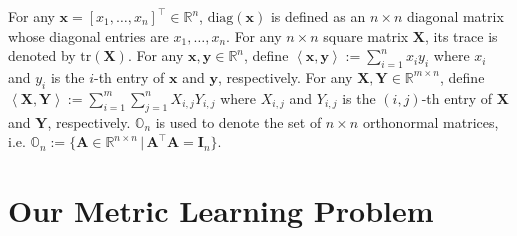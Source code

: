 \documentclass[10pt,onecolumn]{article}
\theoremstyle{definition}
\theoremstyle{definition}
\theoremstyle{definition}
\theoremstyle{definition}
\theoremstyle{definition}
\theoremstyle{theorem}
\newcommand{\0}{{\bm{0}}}
\newcommand{\1}{{\bm{1}}}
\newcommand{\x}{{\bm{x}}}
\newcommand{\y}{{\bm{y}}}
\newcommand{\vA}{{\bm{A}}}
\newcommand{\vC}{{\bm{C}}}
\newcommand{\vI}{{\bm{I}}}
\newcommand{\bN}{{\mathbb{N}}}
\newcommand{\bO}{{\mathbb{O}}}
\newcommand{\cP}{{\mathcal{P}}}
\newcommand{\bR}{{\mathbb{R}}}
\newcommand{\X}{{\bm{X}}}
\newcommand{\Y}{{\bm{Y}}}
\newcommand{\vDel}{{\bm{\Delta}}}
\begin{document}
%
%
For any $\x = \left[x_{1},\dots,x_{n}\right]^\top\in\bR^{n}$, 
$\text{diag}(\x)$ is defined as an $n\times n$ 
diagonal matrix whose diagonal entries are 
$x_{1},\dots,x_{n}$. 
%
For any $n\times n$ square matrix $\X$, its trace is denoted by 
$\text{tr}(\X)$. 
%
For any $\x,\y\in\bR^{n}$, define $\left<\x,\y\right> := \sum_{i=1}^{n}x_{i}y_{i}$
where $x_{i}$ and $y_{i}$ is the $i$-th entry of $\x$ and $\y$, respectively. 
%
For any $\X,\Y\in\bR^{m\times n}$, 
define $\left<\X,\Y\right> := \sum_{i=1}^{m}\sum_{j=1}^{n}X_{i,j}Y_{i,j}$
where $X_{i,j}$ and $Y_{i,j}$ is the $(i,j)$-th entry of $\X$ and $\Y$, respectively.
%
%
$\bO_{n}$ is used to denote the set of $n\times n$ orthonormal
matrices, i.e.
$\bO_{n} := \{\vA \in\bR^{n\times n} \,|\, \vA^\top \vA = \vI_{n}\}.$ 
% 
\section{Our Metric Learning Problem}
%
\end{document}
